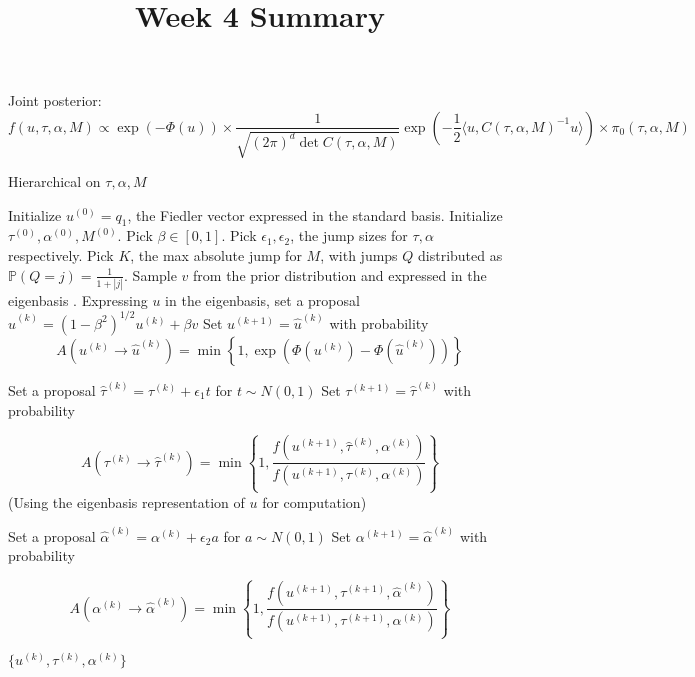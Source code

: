 \documentclass{siamart1116}
\title{Week 4 Summary}
\author{\TheAuthors}
\date{}
\begin{document}
\maketitle
\setlength{\unitlength}{1in}
\setlength{\parindent}{0in}
Joint posterior:
\[f(u,\tau,\alpha,M) \propto \exp(-\Phi(u))\times\frac{1}{\sqrt{(2\pi)^d\det C(\tau,\alpha,M)}} \exp\left(-\frac{1}{2}\langle u,C(\tau,\alpha,M)^{-1} u \rangle\right) \times \pi_0(\tau,\alpha, M)\]
\begin{algorithm}
\caption{Hierarchical on $\tau, \alpha, M$}
\label{alg:hierarchical_tau_alpha}
\begin{algorithmic}
\State Initialize $u^{(0)} = q_1$, the Fiedler vector expressed in the standard basis.
\State Initialize $\tau^{(0)}, \alpha^{(0)}, M^{(0)}$.
\State Pick $\beta \in [0, 1]$. Pick $\epsilon_1, \epsilon_2$, the jump sizes for $\tau, \alpha$ respectively. Pick $K$, the max absolute jump for $M$, with jumps $Q$ distributed as $\mathbb{P}(Q=j)=\frac{1}{1+|j|}$.
\State Sample $v$ from the prior distribution and expressed in the eigenbasis .
\State Expressing $u$ in the eigenbasis, set a proposal $\hat u^{(k)} = (1- \beta^2)^{1/2}u^{(k)} + \beta v$
\State Set $u^{(k+1)} = \hat u^{(k)}$ with probability 
\[A(u^{(k)} \to \hat u^{(k)}) = \min \left\{1, \exp(\Phi(u^{(k)}) - \Phi(\hat u^{(k)})) \right\}\]

\State Set a proposal $\hat \tau^{(k)} = \tau^{(k)} + \epsilon_1 t$ for $t \sim N(0, 1)$ 
\State Set $\tau^{(k+1)} = \hat \tau^{(k)}$ with probability 

\[A(\tau^{(k)} \to \hat \tau^{(k)}) = \min \left\{ 1, \frac{f(u^{(k+1)}, \hat \tau^{(k)}, \alpha^{(k)})}{f(u^{(k+1)}, \tau^{(k)}, \alpha^{(k)})}\right\}\]
(Using the eigenbasis representation of $u$ for computation) 

\State Set a proposal $\hat \alpha^{(k)} = \alpha^{(k)} + \epsilon_2 a$ for $a \sim N(0, 1)$ 
\State Set $\alpha^{(k+1)} = \hat \alpha^{(k)}$ with probability

 \[A(\alpha^{(k)}\to\hat\alpha^{(k)}) = 
 \min\left\{1, 
 \frac{f(u^{(k+1)}, \tau^{(k+1)}, \hat \alpha^{(k)})}
 {f(u^{(k+1)}, \tau^{(k+1)}, \alpha^{(k)})}\right\}
 \]


\EndFor
\State \Return $\{u^{(k)}, \tau^{(k)}, \alpha^{(k)}\}$
\end{algorithmic}
\end{algorithm}
\end{document}

